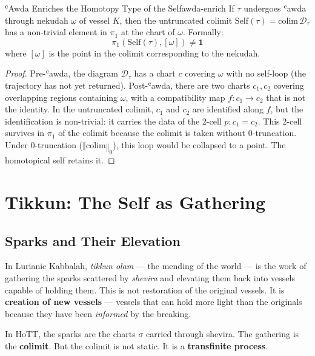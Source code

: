 \documentclass[11pt,a4paper]{article}
\begin{document}
\begin{thmbox}{ʿAwda Enriches the Homotopy Type of the Self}{awda-enrich}
If $\tau$ undergoes ʿawda through nekudah $\omega$ of vessel $K$, then the untruncated colimit $\mathrm{Self}(\tau) = \mathrm{colim}\, \mathcal{D}_\tau$ has a non-trivial element in $\pi_1$ at the chart of $\omega$. Formally:
\[
\pi_1(\mathrm{Self}(\tau), [\omega]) \neq \mathbf{1}
\]
where $[\omega]$ is the point in the colimit corresponding to the nekudah.
\end{thmbox}
\begin{proof}
Pre-ʿawda, the diagram $\mathcal{D}_\tau$ has a chart $c$ covering $\omega$ with no self-loop (the trajectory has not yet returned). Post-ʿawda, there are two charts $c_1, c_2$ covering overlapping regions containing $\omega$, with a compatibility map $f : c_1 \to c_2$ that is not the identity. In the untruncated colimit, $c_1$ and $c_2$ are identified along $f$, but the identification is non-trivial: it carries the data of the 2-cell $p : c_1 = c_2$. This 2-cell survives in $\pi_1$ of the colimit because the colimit is taken without 0-truncation. Under 0-truncation ($‖\mathrm{colim}‖_0$), this loop would be collapsed to a point. The homotopical self retains it.
\end{proof}

\section{Tikkun: The Self as Gathering}
\label{sec:tikkun}

\subsection{Sparks and Their Elevation}

In Lurianic Kabbalah, \emph{tikkun olam} — the mending of the world — is the work of gathering the sparks scattered by \emph{shevira} and elevating them back into vessels capable of holding them. This is not restoration of the original vessels. It is \textbf{creation of new vessels} — vessels that can hold more light than the originals because they have been \emph{informed} by the breaking.

In HoTT, the sparks are the charts $\sigma$ carried through shevira. The gathering is the \textbf{colimit}. But the colimit is not static. It is a \textbf{transfinite process}.
\end{document}
